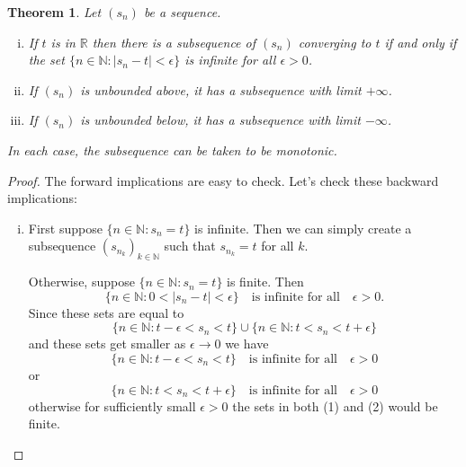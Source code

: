 \documentclass[12pt, lettersize]{book}
\newtheorem{thm}{Theorem}[section]
\begin{document}
		\begin{thm}\label{def:limit-subseq}
		Let $(s_n)$ be a sequence.
		\begin{enumerate}[(i)]
			\item If $t$ is in $\mathbb{R}$ then there is a subsequence of $(s_n)$ converging to $t$ if and only if
			the set $\{n\in\mathbb{N}: |s_n-t|<\epsilon\}$ is \emph{infinite} for all $\epsilon>0$.
			\item If $(s_n)$ is unbounded above, it has a subsequence with limit $+\infty$.
			\item If $(s_n)$ is unbounded below, it has a subsequence with limit $-\infty$.
		\end{enumerate}
		In each case, the subsequence can be taken to be \emph{monotonic}.
		\end{thm}
		\begin{proof}
		The forward implications are easy to check. Let's check these backward implications:
		\begin{enumerate}[(i)]
			\item First suppose $\{n\in\mathbb{N}: s_n=t\}$ is infinite. Then we can simply create a subsequence $(s_{n_k})_{k\in\mathbb{N}}$ such that $s_{n_k}=t$ for all $k$.
			
			Otherwise, suppose $\{n\in\mathbb{N}: s_n=t\}$ is finite. Then
			\begin{displaymath}
				\{n\in\mathbb{N}: 0<|s_n-t|<\epsilon\}\quad\text{is infinite for all}\quad\epsilon>0.
			\end{displaymath}
			Since these sets are equal to
			\begin{displaymath}
				\{n\in\mathbb{N}: t-\epsilon<s_n<t\}\cup\{n\in\mathbb{N}: t<s_n<t+\epsilon\}
			\end{displaymath}
			and these sets get smaller as $\epsilon\rightarrow0$ we have
			\begin{equation}
				\{n\in\mathbb{N}: t-\epsilon<s_n<t\}\quad\text{is infinite for all}\quad\epsilon>0
			\end{equation}
			or
			\begin{equation}
				\{n\in\mathbb{N}: t<s_n<t+\epsilon\}\quad\text{is infinite for all}\quad\epsilon>0
			\end{equation}
			otherwise for sufficiently small $\epsilon>0$ the sets in both (1) and (2) would be finite.
			

\end{enumerate}
\end{proof}
\end{document}
